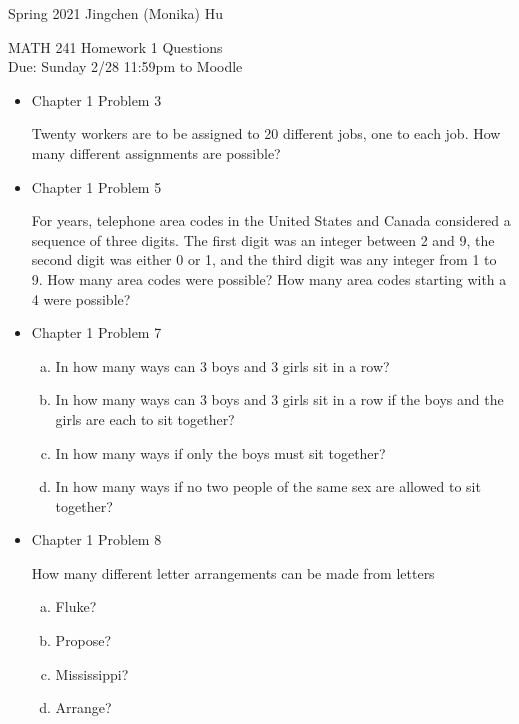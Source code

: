 \documentclass[11pt]{article}
\begin{document}
\enlargethispage{\baselineskip}

Spring 2021 \hfill Jingchen (Monika) Hu\\

\begin{center}
{\huge MATH 241 Homework 1 Questions}	\\
Due: Sunday 2/28 11:59pm to Moodle
\end{center}
\vspace{0.5cm}


\begin{itemize}

    \item
    Chapter 1 Problem 3
    
    Twenty workers are to be assigned to 20 different jobs, one to each job. How many different assignments are possible?
    
    \item
    Chapter 1 Problem 5
    
    For years, telephone area codes in the United States and Canada considered a sequence of three digits. The first digit was an integer between 2 and 9, the second digit was either 0 or 1, and the third digit was any integer from 1 to 9. How many area codes were possible? How many area codes starting with a 4 were possible?
    
    \item
    Chapter 1 Problem  7
    
    \begin{enumerate}[(a)]
    \item In how many ways can 3 boys and 3 girls sit in a row?
    \item In how many ways can 3 boys and 3 girls sit in a row if the boys and the girls are each to sit together?
    \item In how many ways if only the boys must sit together?
    \item In how many ways if no two people of the same sex are allowed to sit together?
    \end{enumerate}
    
    \item
    Chapter 1 Problem  8
    
    How many different letter arrangements can be made from letters
    
    \begin{enumerate}[(a)]
    \item Fluke?
    \item Propose?
    \item Mississippi?
    \item Arrange?
    \end{enumerate}


\end{itemize}
\end{document}
